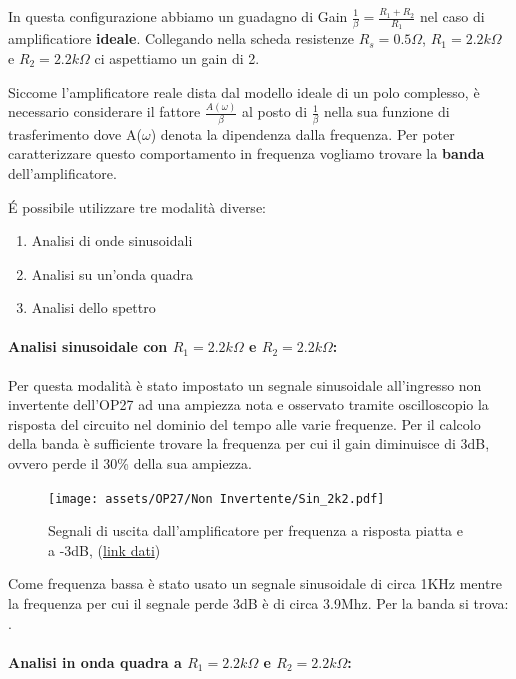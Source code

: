 In questa configurazione abbiamo un guadagno di Gain $\frac{1}{\beta} = \frac{R_1+R_2}{R_1}$ nel caso di amplificatiore \textbf{ideale}.
Collegando nella scheda resistenze $R_s = 0.5 \Omega$, $R_1 = 2.2k\Omega$ e $R_2 = 2.2k\Omega$ ci aspettiamo un gain di 2.

Siccome l'amplificatore reale dista dal modello ideale di un polo complesso, è necessario considerare il fattore $\frac{A(\omega)}{\beta}$ al posto di $\frac{1}{\beta}$ nella sua funzione di trasferimento dove A($\omega$) denota la dipendenza dalla frequenza. Per poter caratterizzare questo comportamento in frequenza vogliamo trovare la \textbf{banda} dell'amplificatore.

\'E possibile utilizzare tre modalità diverse:
\begin{enumerate}
    \item Analisi di onde sinusoidali
    \item Analisi su un'onda quadra
    \item Analisi dello spettro
\end{enumerate}

\paragraph{Analisi sinusoidale con $R_1=2.2k\Omega$ e $R_2=2.2k\Omega$:}

Per questa modalità è stato impostato un segnale sinusoidale all'ingresso non invertente dell'OP27 ad una ampiezza nota e osservato tramite oscilloscopio la risposta del circuito nel dominio del tempo alle varie frequenze. Per il calcolo della banda è sufficiente trovare la frequenza per cui il gain diminuisce di 3dB, ovvero perde il 30\% della sua ampiezza.

\begin{figure}[!h]
    \centering
    \texttt{[image: assets/OP27/Non Invertente/Sin\_2k2.pdf]}
    \caption{Segnali di uscita dall'amplificatore per frequenza a risposta piatta e a -3dB, (\href{https://github.com/Yedi278/Esperimentazioni-Elettronica/tree/main/-\%20OPAMP/OP27/Non-Invertente/R1\%3D2.2k\%2CR2\%3D2.2k}{link dati})}
\end{figure}

Come frequenza bassa è stato usato un segnale sinusoidale di circa 1KHz mentre la frequenza per cui il segnale perde 3dB è di circa 3.9Mhz.
Per la banda si trova: .

\paragraph{Analisi in onda quadra a $R_1=2.2k\Omega$ e $R_2=2.2k\Omega$:}

